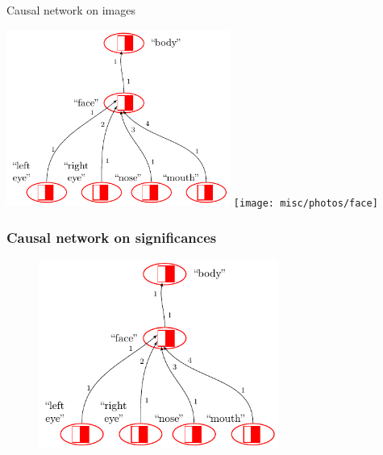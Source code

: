 \documentclass[default]{beamer}
\begin{document}
	\begin{frame}{Causal network on images}
		
		\centering
		\includegraphics[page=1,width=0.55\textwidth]{examples/causnet/caus_net_colored_en}
		\texttt{[image: misc/photos/face]}
		
		\nocite{*}
		\printbibliography[keyword={signopernew}, resetnumbers=true]
	\end{frame}
	
	\begin{frame}
	\frametitle{Causal network on significances}
	
	\begin{figure}
	\includegraphics[page=2,width=0.7\textwidth]{examples/causnet/caus_net_colored_en}
	\end{figure}
	
	\end{frame}
	
\end{document}
